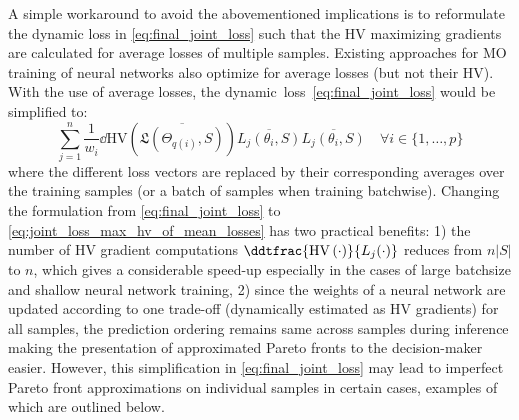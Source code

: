A simple workaround to avoid the abovementioned implications is to reformulate the dynamic loss in \eqref{eq:final_joint_loss} such that the HV maximizing gradients are calculated for average losses of multiple samples. Existing approaches \citep{sener2018multi, lin2019paretomtl, mahapatra2020multi} for MO training of neural networks also optimize for average losses (but not their HV). With the use of average losses, the dynamic~loss~\eqref{eq:final_joint_loss} would be simplified to:
\begin{equation}
 \sum_{j=1}^{n}\frac{1}{w_{i}}\dd{\mathrm{HV}\left(\overline{\mathfrak{L}(\Theta_{q(i)},S)} \right)}{\overline{L_{j}(\theta_{i},S)}}\overline{L_{j}(\theta_{i},S)} \label{eq:joint_loss_max_hv_of_mean_losses}\quad\forall i\in\{1,\dots,p\}
\end{equation}
where the different loss vectors are replaced by their corresponding averages over the training samples (or a batch of samples when training batchwise). Changing the formulation from \eqref{eq:final_joint_loss} to \eqref{eq:joint_loss_max_hv_of_mean_losses} has two practical benefits: 1) the number of HV gradient computations $\ddtfrac{\mathrm{HV}\left(\cdot \right)}{{L_{j}(\cdot)}}$ reduces from $n|S|$ to $n$, which gives a considerable speed-up especially in the cases of large batchsize and shallow neural network training, 2) since the weights of a neural network are updated according to one trade-off (dynamically estimated as HV gradients) for all samples, the prediction ordering remains same across samples during inference making the presentation of approximated Pareto fronts to the decision-maker easier. However, this simplification in \eqref{eq:final_joint_loss} may lead to imperfect Pareto front approximations on individual samples in certain cases, examples of which are outlined below.
